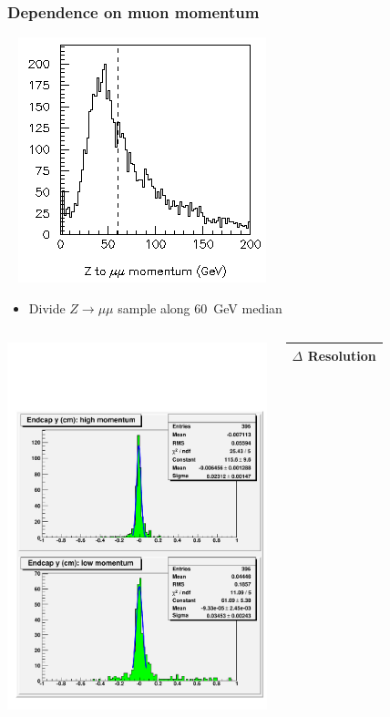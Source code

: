 \documentclass[compress]{beamer}
\begin{document}
\begin{frame}
\frametitle{Dependence on muon momentum}

\vspace{-1 cm}
\mbox{ } \hfill \includegraphics[width=2 cm]{p_distribution.png}

\vspace{-1.3 cm}
\begin{itemize}
\item Divide $Z\to\mu\mu$ sample along 60~GeV median
\end{itemize}

\begin{columns}
\includegraphics[width=\linewidth]{momentum_endcap_y.pdf}
\begin{tabular}{l}
$\Delta$ Resolution \\\hline\hline
\end{tabular}


\end{columns}
\end{frame}
\end{document}
